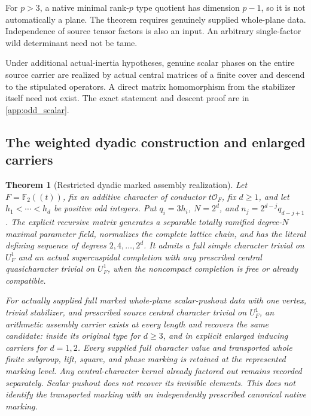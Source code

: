 \documentclass[11pt]{amsart}
\newtheorem{theorem}{Theorem}[section]
\theoremstyle{definition}
\theoremstyle{remark}
\newcommand{\FF}{\mathbb F}
\newcommand{\OO}{\mathcal O}
\begin{document}
For \(p>3\), a native minimal rank-\(p\) type quotient has dimension
\(p-1\), so it is not automatically a plane. The theorem requires
genuinely supplied whole-plane data. Independence of source tensor
factors is also an input. An arbitrary single-factor wild determinant
need not be tame.

Under additional actual-inertia hypotheses, genuine scalar phases on
the entire source carrier are realized by actual central matrices of a
finite cover and descend to the stipulated operators. A direct matrix
homomorphism from the stabilizer itself need not exist. The exact
statement and descent proof are in \cref{app:odd_scalar}.

\subsection{The weighted dyadic construction and enlarged carriers}

\begin{theorem}[Restricted dyadic marked assembly realization]
\label{thm:dyadic_arithmetic}
Let \(F=\FF_2((t))\), fix an additive character of conductor
\(t\OO_F\), fix \(d\ge1\), and let \(h_1<\cdots<h_d\) be positive odd integers.
Put \(q_i=3h_i\), \(N=2^d\), and
\(n_j=2^{d-j}q_{d-j+1}\). The explicit recursive matrix generates a
separable totally ramified degree-\(N\) maximal parameter field,
normalizes the complete lattice chain, and has the literal defining
sequence of degrees \(2,4,\ldots,2^d\). It admits a full simple character
trivial on \(U_F^1\) and an actual supercuspidal completion with any
prescribed central quasicharacter trivial on \(U_F^1\), when the
noncompact completion is free or already compatible.

For actually supplied full marked whole-plane scalar-pushout data with
one vertex, trivial stabilizer, and prescribed source central character
trivial on \(U_F^1\), an arithmetic assembly carrier exists
at every length and recovers the same candidate: inside its original
type for \(d\ge3\), and in explicit enlarged inducing carriers for
\(d=1,2\). Every supplied full character value and transported whole
finite subgroup, lift, square, and phase marking is retained at the
represented marking level. Any central-character kernel already factored
out remains recorded separately. Scalar pushout does not recover its
invisible elements. This does
not identify the transported marking with an independently prescribed
canonical native marking.
\end{theorem}
\end{document}
